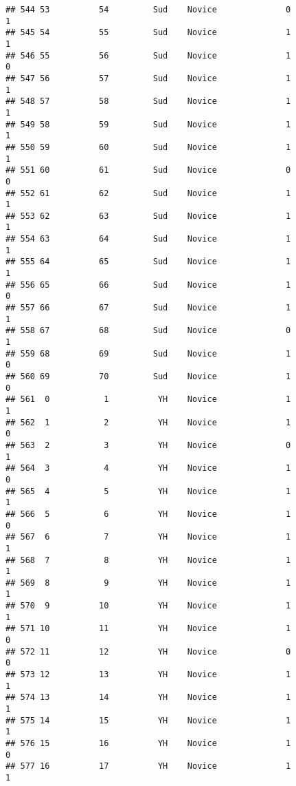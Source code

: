 \documentclass[
]{article}
\begin{document}
\begin{verbatim}
## 544 53          54         Sud    Novice              0                 1
## 545 54          55         Sud    Novice              1                 1
## 546 55          56         Sud    Novice              1                 0
## 547 56          57         Sud    Novice              1                 1
## 548 57          58         Sud    Novice              1                 1
## 549 58          59         Sud    Novice              1                 1
## 550 59          60         Sud    Novice              1                 1
## 551 60          61         Sud    Novice              0                 0
## 552 61          62         Sud    Novice              1                 1
## 553 62          63         Sud    Novice              1                 1
## 554 63          64         Sud    Novice              1                 1
## 555 64          65         Sud    Novice              1                 1
## 556 65          66         Sud    Novice              1                 0
## 557 66          67         Sud    Novice              1                 1
## 558 67          68         Sud    Novice              0                 1
## 559 68          69         Sud    Novice              1                 0
## 560 69          70         Sud    Novice              1                 0
## 561  0           1          YH    Novice              1                 1
## 562  1           2          YH    Novice              1                 0
## 563  2           3          YH    Novice              0                 1
## 564  3           4          YH    Novice              1                 0
## 565  4           5          YH    Novice              1                 1
## 566  5           6          YH    Novice              1                 0
## 567  6           7          YH    Novice              1                 1
## 568  7           8          YH    Novice              1                 1
## 569  8           9          YH    Novice              1                 1
## 570  9          10          YH    Novice              1                 1
## 571 10          11          YH    Novice              1                 0
## 572 11          12          YH    Novice              0                 0
## 573 12          13          YH    Novice              1                 1
## 574 13          14          YH    Novice              1                 1
## 575 14          15          YH    Novice              1                 1
## 576 15          16          YH    Novice              1                 0
## 577 16          17          YH    Novice              1                 1

\end{verbatim}
\end{document}

